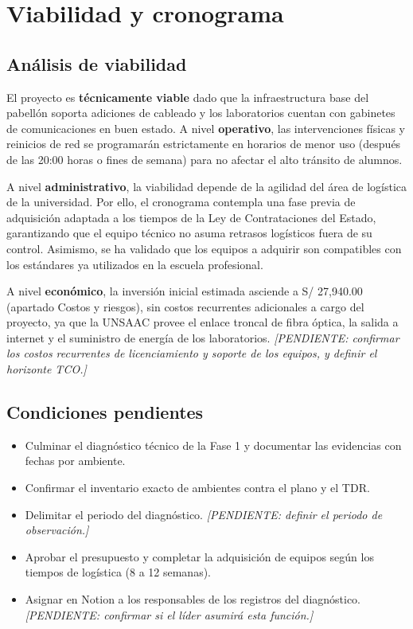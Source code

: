 \section{Viabilidad y cronograma}

\subsection{Análisis de viabilidad}

	El proyecto es \textbf{técnicamente viable} dado que la infraestructura base del pabellón soporta adiciones de cableado y los laboratorios cuentan con gabinetes de comunicaciones en buen estado. A nivel \textbf{operativo}, las intervenciones físicas y reinicios de red se programarán estrictamente en horarios de menor uso (después de las 20:00 horas o fines de semana) para no afectar el alto tránsito de alumnos.

	A nivel \textbf{administrativo}, la viabilidad depende de la agilidad del área de logística de la universidad. Por ello, el cronograma contempla una fase previa de adquisición adaptada a los tiempos de la Ley de Contrataciones del Estado, garantizando que el equipo técnico no asuma retrasos logísticos fuera de su control. Asimismo, se ha validado que los equipos a adquirir son compatibles con los estándares ya utilizados en la escuela profesional.

	A nivel \textbf{económico}, la inversión inicial estimada asciende a S/ 27,940.00 (apartado Costos y riesgos), sin costos recurrentes adicionales a cargo del proyecto, ya que la UNSAAC provee el enlace troncal de fibra óptica, la salida a internet y el suministro de energía de los laboratorios. \textit{[PENDIENTE: confirmar los costos recurrentes de licenciamiento y soporte de los equipos, y definir el horizonte TCO.]}

\subsection{Condiciones pendientes}

	\begin{itemize}
		\item Culminar el diagnóstico técnico de la Fase 1 y documentar las evidencias con fechas por ambiente.
		\item Confirmar el inventario exacto de ambientes contra el plano y el TDR.
		\item Delimitar el periodo del diagnóstico. \textit{[PENDIENTE: definir el periodo de observación.]}
		\item Aprobar el presupuesto y completar la adquisición de equipos según los tiempos de logística (8 a 12 semanas).
		\item Asignar en Notion a los responsables de los registros del diagnóstico. \textit{[PENDIENTE: confirmar si el líder asumirá esta función.]}
	\end{itemize}

